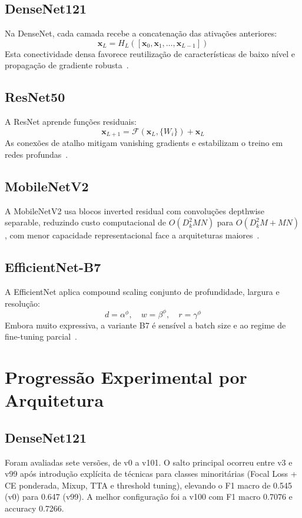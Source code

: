 \documentclass[runningheads]{llncs}
\begin{document}
\subsection{DenseNet121}
Na DenseNet, cada camada recebe a concatenação das ativações anteriores:
\begin{equation}
\mathbf{x}_L = H_L([\mathbf{x}_0, \mathbf{x}_1, \ldots, \mathbf{x}_{L-1}])
\end{equation}
Esta conectividade densa favorece reutilização de características de baixo
nível e propagação de gradiente robusta~\cite{huang2017}.

\subsection{ResNet50}
A ResNet aprende funções residuais:
\begin{equation}
\mathbf{x}_{L+1} = \mathcal{F}(\mathbf{x}_L, \{W_i\}) + \mathbf{x}_L
\end{equation}
As conexões de atalho mitigam vanishing gradients e estabilizam o treino em
redes profundas~\cite{he2016}.

\subsection{MobileNetV2}
A MobileNetV2 usa blocos inverted residual com convoluções depthwise separable,
reduzindo custo computacional de
\(O(D_k^2MN)\) para \(O(D_k^2M + MN)\), com menor capacidade representacional
face a arquiteturas maiores~\cite{sandler2018}.

\subsection{EfficientNet-B7}
A EfficientNet aplica compound scaling conjunto de profundidade, largura e
resolução:
\begin{equation}
d = \alpha^{\phi}, \quad w = \beta^{\phi}, \quad r = \gamma^{\phi}
\end{equation}
Embora muito expressiva, a variante B7 é sensível a batch size e ao regime de
fine-tuning parcial~\cite{tan2019}.

\section{Progressão Experimental por Arquitetura}

\subsection{DenseNet121}
Foram avaliadas sete versões, de v0 a v101. O salto principal ocorreu entre v3
e v99 após introdução explícita de técnicas para classes minoritárias
(Focal Loss + CE ponderada, Mixup, TTA e threshold tuning), elevando o F1 macro
de 0.545 (v0) para 0.647 (v99). A melhor configuração foi a v100 com
F1 macro 0.7076 e accuracy 0.7266.
\end{document}
